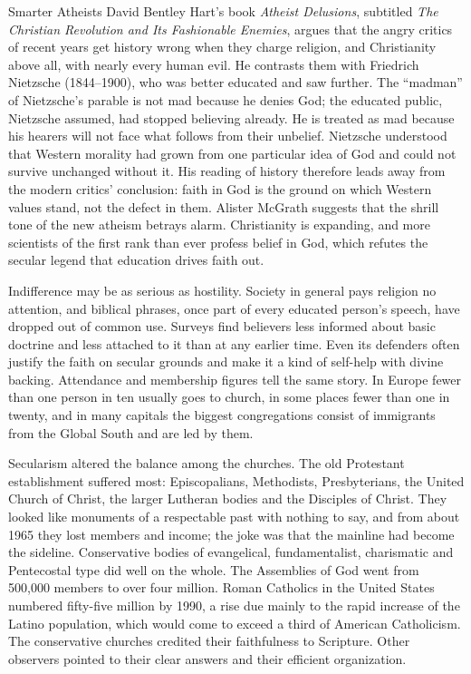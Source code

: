 \begin{sidebox}{Smarter Atheists}
David Bentley Hart's book \emph{Atheist Delusions}, subtitled \emph{The Christian Revolution and Its Fashionable Enemies}, argues that the angry critics of recent years get history wrong when they charge religion, and
Christianity above all, with nearly every human evil. He contrasts them with Friedrich Nietzsche
(1844--1900), who was better educated and saw further. The ``madman'' of Nietzsche's parable is not
mad because he denies God; the educated public, Nietzsche assumed, had stopped believing already. He
is treated as mad because his hearers will not face what follows from their unbelief. Nietzsche
understood that Western morality had grown from one particular idea of God and could not survive
unchanged without it. His reading of history therefore leads away from the modern critics'
conclusion: faith in God is the ground on which Western values stand, not the defect in them. Alister
McGrath suggests that the shrill tone of the new atheism betrays alarm. Christianity is expanding,
and more scientists of the first rank than ever profess belief in God, which refutes the secular
legend that education drives faith out.
\end{sidebox}

Indifference may be as serious as hostility. Society in general pays religion no attention, and
biblical phrases, once part of every educated person's speech, have dropped out of common use.
Surveys find believers less informed about basic doctrine and less attached to it than at any
earlier time. Even its defenders often justify the faith on secular grounds and make it a kind of
self-help with divine backing. Attendance and membership figures tell the same story. In Europe fewer
than one person in ten usually goes to church, in some places fewer than one in twenty, and in many
capitals the biggest congregations consist of immigrants from the Global South and are led by them.

Secularism altered the balance among the churches. The old Protestant establishment suffered most:
Episcopalians, Methodists, Presbyterians, the United Church of Christ, the larger Lutheran bodies and
the Disciples of Christ. They looked like monuments of a respectable past with nothing to say, and
from about 1965 they lost members and income; the joke was that the mainline had become the sideline.
Conservative bodies of evangelical, fundamentalist, charismatic and Pentecostal type did well on the
whole. The Assemblies of God went from 500,000 members to over four million. Roman Catholics in the
United States numbered fifty-five million by 1990, a rise due mainly to the rapid increase of the
Latino population, which would come to exceed a third of American Catholicism. The conservative
churches credited their faithfulness to Scripture. Other observers pointed to their clear answers and
their efficient organization.

